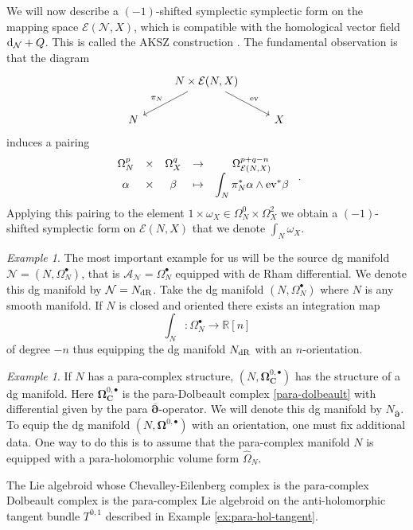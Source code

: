 \documentclass[letterpaper,12pt]{article}
\newcommand{\Cc}{\mathbf{C}}
\newcommand{\RR}{\mathbb{R}}
\newcommand{\cE}{\mathcal{E}}
\newcommand{\cN}{\mathcal{N}}
\newcommand{\sA}{\mathcal{A}}
\def\d{{\rm d}}
\newcommand{\p}{\partial}
\newcommand{\pd}{\overline{\bm{\p}}}
\theoremstyle{definition}
\theoremstyle{remark}
\theoremstyle{examples}
\newtheorem{Ex}[theorem]{Example}
\begin{document}
We will now describe a $(-1)$-shifted symplectic symplectic form on the mapping space $\cE(\cN, X)$, which is compatible with the homological vector field $\d_{\cN} + Q$. This is called the AKSZ construction \cite{AKSZ}.
The fundamental observation is that the diagram
\begin{equation*}
	\begin{tikzcd}
	& N \times \cE(N, X)\arrow{rd}{{\rm ev}}\arrow[swap]{ld}{\pi_N} &\\
	N & & X
	\end{tikzcd}
\end{equation*}
induces a pairing
\[
\begin{array}{ccccc}
 \Omega^p_N& \times & \Omega^q_X & \to & \Omega^{p+q-n}_{\cE(N, X)} \\
\displaystyle \alpha & \times & \beta & \mapsto & \displaystyle \int_N \pi_N^* \alpha \wedge {\rm ev}^* \beta 
 \end{array}\ .
 \]
Applying this pairing to the element $1 \times \omega_X \in \Omega^0_N \times \Omega^{2}_X$ we obtain a $(-1)$-shifted symplectic form on $\cE(N, X)$ that we denote $\int_N \omega_X$.

\begin{Ex}
The most important example for us will be the source dg manifold $\cN = (N, \Omega^\bullet_N)$, that is $\sA_\cN = \Omega^\bullet_N$ equipped with de Rham differential. 
We denote this dg manifold by $\cN = N_{\rm dR}$.
Take the dg manifold $(N, \Omega^\bullet_N)$ where $N$ is any smooth manifold. 
If $N$ is closed and oriented there exists an integration map
\[
\int_N : \Omega^\bullet_N \to \RR[n]
\]
of degree $-n$ thus equipping the dg manifold $N_{\rm dR}$ with an $n$-orientation. 
\end{Ex}

\begin{Ex}
If $N$ has a para-complex structure, $(N, \mathbf{\Omega}^{0,\bullet}_\Cc)$ has the structure of a dg manifold. 
Here $\mathbf{\Omega}_\Cc^{0,\bullet}$ is the para-Dolbeault complex \eqref{para-dolbeault} with differential given by the para $\pd$-operator. 
We will denote this dg manifold by $N_{\pd}$. 
To equip the dg manifold $(N, \mathbf{\Omega}^{0,\bullet})$ with an orientation, one must fix additional data. 
One way to do this is to assume that the para-complex manifold $N$ is equipped with a para-holomorphic volume form $\hat{\Omega}_N$.

The Lie algebroid whose Chevalley-Eilenberg complex is the para-complex Dolbeault complex is the para-complex Lie algebroid on the anti-holomorphic tangent bundle $T^{0,1}$ described in Example \ref{ex:para-hol-tangent}.
\end{Ex}
\end{document}
